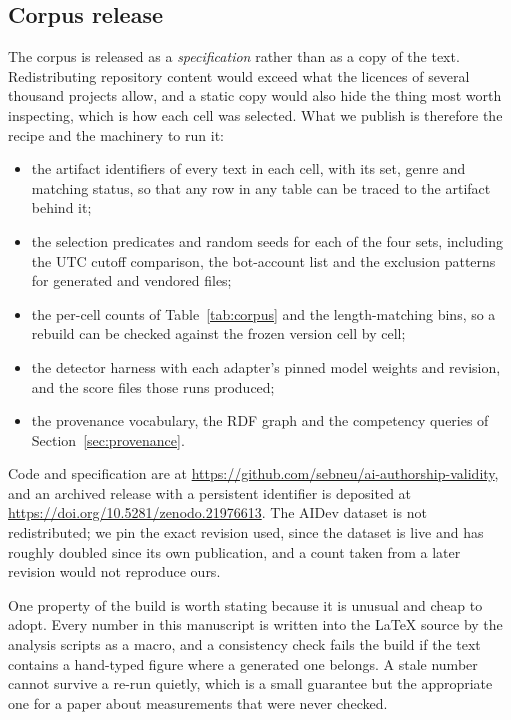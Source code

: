 \subsection{Corpus release}
\label{sec:groundtruth:release}

The corpus is released as a \emph{specification} rather than as a copy of the text.
Redistributing repository content would exceed what the licences of several thousand
projects allow, and a static copy would also hide the thing most worth inspecting, which
is how each cell was selected. What we publish is therefore the recipe and the machinery
to run it:

\begin{itemize}
  \item the artifact identifiers of every text in each cell, with its set, genre and
    matching status, so that any row in any table can be traced to the artifact behind
    it;
  \item the selection predicates and random seeds for each of the four sets, including
    the UTC cutoff comparison, the bot-account list and the exclusion patterns for
    generated and vendored files;
  \item the per-cell counts of Table~\ref{tab:corpus} and the length-matching bins, so a
    rebuild can be checked against the frozen version cell by cell;
  \item the detector harness with each adapter's pinned model weights and revision, and
    the score files those runs produced;
  \item the provenance vocabulary, the RDF graph and the competency queries of
    Section~\ref{sec:provenance}.
\end{itemize}

Code and specification are at
\url{https://github.com/sebneu/ai-authorship-validity}, and an archived release with a
persistent identifier is deposited at \url{https://doi.org/10.5281/zenodo.21976613}. The AIDev dataset
\citep{li2025aidev} is not redistributed; we pin the exact revision used, since the
dataset is live and has roughly doubled since its own publication, and a count taken
from a later revision would not reproduce ours.

One property of the build is worth stating because it is unusual and cheap to adopt.
Every number in this manuscript is written into the \LaTeX{} source by the analysis
scripts as a macro, and a consistency check fails the build if the text contains a
hand-typed figure where a generated one belongs. A stale number cannot survive a re-run
quietly, which is a small guarantee but the appropriate one for a paper about
measurements that were never checked.

